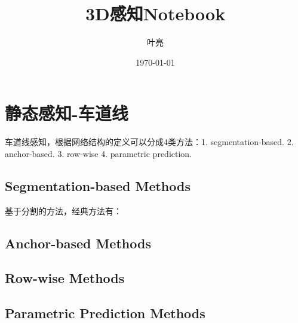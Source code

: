 \documentclass{article}
\title{3D感知Notebook}
\author{叶亮}
\date{\today}
\begin{document}
 
\maketitle
\tableofcontents

\section{静态感知-车道线}
车道线感知，根据网络结构的定义可以分成4类方法：1. segmentation-based. 2. anchor-based.  3. row-wise 4. parametric prediction.
\subsection{Segmentation-based Methods}
基于分割的方法，经典方法有：

\subsection{Anchor-based Methods}

\subsection{Row-wise Methods}

\subsection{Parametric Prediction Methods}
\end{document}
